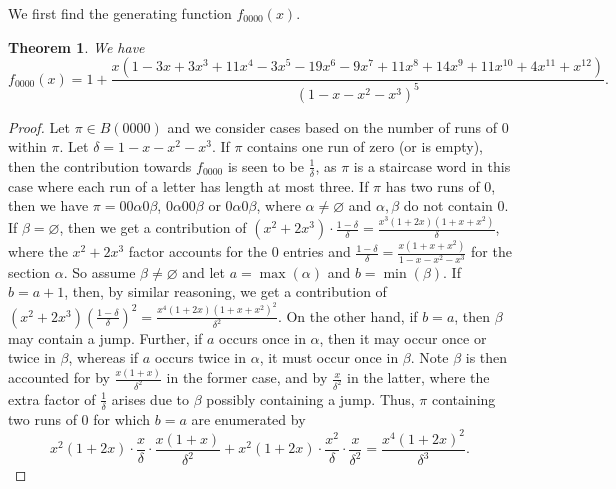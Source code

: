 \documentclass{article}
\theoremstyle{remark}
\theoremstyle{plain}
\newtheorem{theorem}{Theorem}[section]
\begin{document}
We first find the generating function $f_{0000}(x)$.

\begin{theorem}\label{0000th}
We have
\begin{equation}\label{0000the1}
f_{0000}(x)=1+\frac{x(1-3x+3x^3+11x^4-3x^5-19x^6-9x^7+11x^8+14x^9+11x^{10}+4x^{11}+x^{12})}{(1-x-x^2-x^3)^5}.
\end{equation}
\end{theorem}
\begin{proof}
Let $\pi \in B(0000)$ and we consider cases based on the number of runs of 0 within $\pi$.  Let $\delta=1-x-x^2-x^3$. If $\pi$ contains one run of zero (or is empty), then the contribution towards $f_{0000}$ is seen to be $\frac{1}{\delta}$, as $\pi$ is a staircase word in this case where each run of a letter has length at most three.  If $\pi$ has two runs of 0, then we have $\pi=00\alpha0\beta$, $0\alpha00\beta$ or $0\alpha0\beta$, where $\alpha \neq \varnothing$ and $\alpha,\beta$ do not contain 0.  If $\beta=\varnothing$, then we get a contribution of $(x^2+2x^3)\cdot\frac{1-\delta}{\delta}=\frac{x^3(1+2x)(1+x+x^2)}{\delta}$, where the $x^2+2x^3$ factor accounts for the 0 entries and $\frac{1-\delta}{\delta}=\frac{x(1+x+x^2)}{1-x-x^2-x^3}$ for the section $\alpha$.
So assume $\beta\neq \varnothing$ and let $a=\max(\alpha)$ and $b=\min(\beta)$.  If $b=a+1$, then, by similar reasoning, we get a contribution of $(x^2+2x^3)\left(\frac{1-\delta}{\delta}\right)^2=\frac{x^4(1+2x)(1+x+x^2)^2}{\delta^2}$.
On the other hand, if $b=a$, then $\beta$ may contain a jump.  Further, if $a$ occurs once in $\alpha$, then it may occur once or twice in $\beta$, whereas if $a$ occurs twice in $\alpha$, it must occur once in $\beta$.  Note $\beta$ is then accounted for by $\frac{x(1+x)}{\delta^2}$ in the former case, and by $\frac{x}{\delta^2}$ in the latter, where the extra factor of $\frac{1}{\delta}$ arises due to $\beta$ possibly containing a jump.  Thus, $\pi$ containing two runs of 0 for which $b=a$ are enumerated by
$$x^2(1+2x)\cdot\frac{x}{\delta}\cdot\frac{x(1+x)}{\delta^2}+x^2(1+2x)\cdot\frac{x^2}{\delta}\cdot\frac{x}{\delta^2}=\frac{x^4(1+2x)^2}{\delta^3}.$$


\end{proof}
\end{document}
